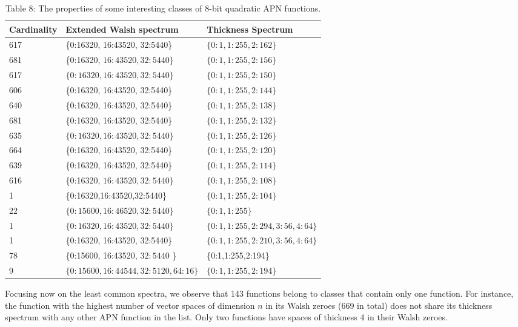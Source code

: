 \documentclass[10pt]{article}
\begin{document}
\begin{table}[h]
\begin{center}
\begin{tabular}{|l|l|l|}
\hline
Cardinality & Extended Walsh spectrum & Thickness Spectrum \\
\hline
617 & \{0:16320, 16:43520, 32:5440\} & $\{0: 1,1: 255,2: 162\}$ \\
\hline
681 & \{0:16320, $16: 43520,32: 5440\}$ & $\{0: 1,1: 255,2: 156\}$ \\
\hline
617 & $\{0: 16320,16: 43520,32: 5440\}$ & $\{0: 1,1: 255,2: 150\}$ \\
\hline
606 & \{0:16320, 16:43520, 32:5440\} & $\{0: 1,1: 255,2: 144\}$ \\
\hline
640 & \{0:16320, 16:43520, 32:5440\} & $\{0: 1,1: 255,2: 138\}$ \\
\hline
681 & \{0:16320, 16:43520, 32:5440\} & $\{0: 1,1: 255,2: 132\}$ \\
\hline
635 & $\{0: 16320,16: 43520,32: 5440\}$ & $\{0: 1,1: 255,2: 126\}$ \\
\hline
664 & \{0:16320, 16:43520, 32:5440\} & $\{0: 1,1: 255,2: 120\}$ \\
\hline
639 & \{0:16320, 16:43520, 32:5440\} & $\{0: 1,1: 255,2: 114\}$ \\
\hline
616 & \{0:16320, $16: 43520,32: 5440\}$ & $\{0: 1,1: 255,2: 108\}$ \\
\hline
1 & \{0:16320,16:43520,32:5440\} & $\{0: 1,1: 255,2: 104\}$ \\
\hline
22 & $\{0: 15600,16: 46520,32: 5440\}$ & $\{0: 1,1: 255\}$ \\
\hline
1 & $\{0: 16320,16: 43520,32: 5440\}$ & $\{0: 1,1: 255,2: 294,3: 56,4: 64\}$ \\
\hline
1 & \{0:16320, 16:43520, 32:5440\} & $\{0: 1,1: 255,2: 210,3: 56,4: 64\}$ \\
\hline
78 & \{0:15600, 16:43520, $32: 5440$ \} & \{0:1,1:255,2:194\} \\
\hline
9 & $\{0: 15600,16: 44544,32: 5120,64: 16\}$ & $\{0: 1,1: 255,2: 194\}$ \\
\hline
\end{tabular}
\captionsetup{labelformat=empty}
\caption{Table 8: The properties of some interesting classes of 8-bit quadratic APN functions.}
\end{center}
\end{table}

Focusing now on the least common spectra, we observe that 143 functions belong to classes that contain only one function. For instance, the function with the highest number of vector spaces of dimension $n$ in its Walsh zeroes (669 in total) does not share its thickness spectrum with any other APN function in the list. Only two functions have spaces of thickness 4 in their Walsh zeroes.
\end{document}
